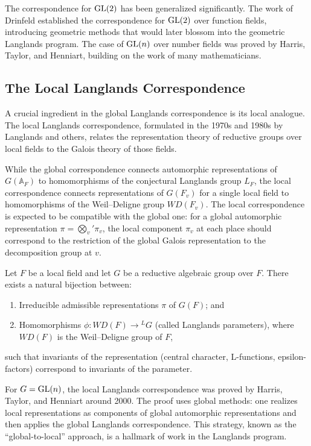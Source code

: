 The correspondence for \(\operatorname{GL}(2)\) has been generalized significantly. The work of Drinfeld established the correspondence for \(\operatorname{GL}(2)\) over function fields, introducing geometric methods that would later blossom into the geometric Langlands program. The case of \(\operatorname{GL}(n)\) over number fields was proved by Harris, Taylor, and Henniart, building on the work of many mathematicians.

\subsection{The Local Langlands Correspondence}

A crucial ingredient in the global Langlands correspondence is its local analogue. The local Langlands correspondence, formulated in the 1970s and 1980s by Langlands and others, relates the representation theory of reductive groups over local fields to the Galois theory of those fields.

While the global correspondence connects automorphic representations of \(G(\mathbb{A}_F)\) to homomorphisms of the conjectural Langlands group \(L_F\), the local correspondence connects representations of \(G(F_v)\) for a single local field to homomorphisms of the Weil--Deligne group \(WD(F_v)\). The local correspondence is expected to be compatible with the global one: for a global automorphic representation \(\pi = \bigotimes_v' \pi_v\), the local component \(\pi_v\) at each place should correspond to the restriction of the global Galois representation to the decomposition group at \(v\).

\begin{conjecture}
Let \(F\) be a local field and let \(G\) be a reductive algebraic group over \(F\). There exists a natural bijection between:
\begin{enumerate}
\item Irreducible admissible representations \(\pi\) of \(G(F)\); and
\item Homomorphisms \(\phi : WD(F) \to {}^L G\) (called Langlands parameters), where \(WD(F)\) is the Weil--Deligne group of \(F\),
\end{enumerate}
such that invariants of the representation (central character, L-functions, epsilon-factors) correspond to invariants of the parameter.
\end{conjecture}

For \(G = \operatorname{GL}(n)\), the local Langlands correspondence was proved by Harris, Taylor, and Henniart around 2000. The proof uses global methods: one realizes local representations as components of global automorphic representations and then applies the global Langlands correspondence. This strategy, known as the ``global-to-local'' approach, is a hallmark of work in the Langlands program.

